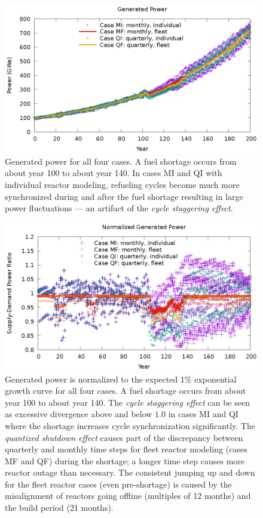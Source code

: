 \documentclass{style}
\begin{document}
\begin{figure}[!h]
    \centering
    \includegraphics[width=1.0\textwidth]{exp2/power.eps}
    \caption[Generated power]{
        Generated power for all four cases.  A fuel shortage occurs from about
        year 100 to about year 140.  In cases MI and QI with individual reactor
        modeling, refueling cycles become much more synchronized during and
        after the fuel shortage resulting in large power fluctuations --- an artifact of the
        \emph{cycle staggering effect}.
    }
    \label{fig:power}
\end{figure}

\begin{figure}[!h]
    \centering
    \includegraphics[width=1.0\textwidth]{exp2/power-rel.eps}
    \caption[Normalized power]{
        Generated power is normalized to the expected 1\% exponential growth
        curve for all four cases.  A fuel shortage occurs from about year 100
        to about year 140.  The \emph{cycle staggering effect} can be seen as
        excessive divergence above and below $1.0$ in cases MI and QI where
        the shortage increases cycle synchronization significantly. The
        \emph{quantized shutdown effect} causes part of the discrepancy
        between quarterly and monthly time steps for fleet reactor modeling
        (cases MF and QF) during the shortage; a longer time step causes more
        reactor outage than necessary. The consistent jumping up and down for
        the fleet reactor cases (even pre-shortage) is caused by the misalignment of reactors going
        offline (multiples of 12 months) and the build period (21 months).
    }
    \label{fig:power-rel}
\end{figure}
\end{document}
